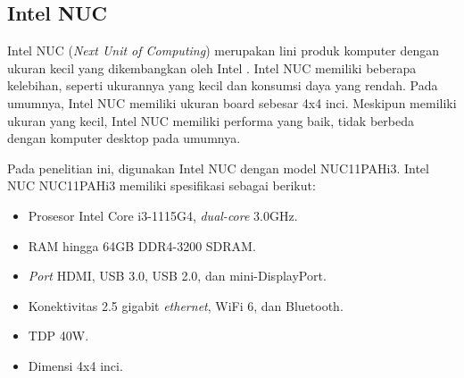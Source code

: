 \subsection{Intel NUC}
\label{subsec: landasan-nuc}
Intel NUC (\textit{Next Unit of Computing}) merupakan lini produk komputer dengan ukuran kecil yang dikembangkan oleh Intel \parencite{bhismasidartoReviewNextUnit2013}.
Intel NUC memiliki beberapa kelebihan, seperti ukurannya yang kecil dan konsumsi daya yang rendah.
Pada umumnya, Intel NUC memiliki ukuran board sebesar 4x4 inci.
Meskipun memiliki ukuran yang kecil, Intel NUC memiliki performa yang baik, tidak berbeda dengan komputer desktop pada umumnya.

Pada penelitian ini, digunakan Intel NUC dengan model NUC11PAHi3.
Intel NUC NUC11PAHi3 memiliki spesifikasi sebagai berikut:
\begin{itemize}
  \item Prosesor Intel Core i3-1115G4, \textit{dual-core} 3.0GHz.
  \item RAM hingga 64GB DDR4-3200 SDRAM.
  \item \textit{Port} HDMI, USB 3.0, USB 2.0, dan mini-DisplayPort.
  \item Konektivitas 2.5 gigabit \textit{ethernet}, WiFi 6, dan Bluetooth.
  \item TDP 40W.
  \item Dimensi 4x4 inci.
\end{itemize}



